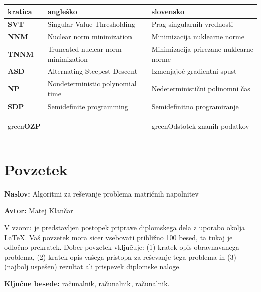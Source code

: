 \documentclass[a4paper,12pt,openright]{book}
\newcommand{\ttitle}{Algoritmi za reševanje problema matričnih napolnitev}
\newcommand{\tauthor}{Matej Klančar}
\newcommand{\tkeywords}{računalnik, računalnik, računalnik}
\newcommand{\clearemptydoublepage}{\newpage{\pagestyle{empty}\cleardoublepage}}
\newcommand{\CG}[1]{\begin{color}{green}#1\end{color}}
\begin{document}
\noindent\begin{tabular}{p{}|p{}|p{}}    %
    {\bf kratica} & {\bf angleško}                      & {\bf slovensko}                        \\ \hline
    {\bf SVT }    & Singular Value Thresholding         & Prag singularnih vrednosti             \\
    {\bf NNM}     & Nuclear norm minimization           & Minimizacija nuklearne norme           \\
    {\bf TNNM}    & Truncated nuclear norm minimization & Minimizacija prirezane nuklearne norme \\
    {\bf ASD}     & Alternating Steepest Descent        & Izmenjajoč gradientni spust            \\
    {\bf NP}     & Nondeterministic polynomial time       & Nedeterministični polinomni čas            \\
    {\bf SDP}     & Semidefinite programming        & Semidefinitno programiranje            \\
    \CG{\bf OZP}     &         & \CG{Odstotek znanih podatkov}            \\
\end{tabular}


\clearemptydoublepage

{}
\chapter*{Povzetek}

\noindent\textbf{Naslov:} \ttitle
\bigskip

\noindent\textbf{Avtor:} \tauthor
\bigskip

\noindent V vzorcu je predstavljen postopek priprave diplomskega dela z uporabo okolja \LaTeX. Vaš povzetek mora sicer vsebovati približno 100 besed, ta tukaj je odločno prekratek.
Dober povzetek vključuje: (1) kratek opis obravnavanega problema, (2) kratek opis vašega pristopa za reševanje tega problema in (3) (najbolj uspešen) rezultat ali prispevek diplomske naloge.

\bigskip

\noindent\textbf{Ključne besede:} \tkeywords.
\clearemptydoublepage
\end{document}
